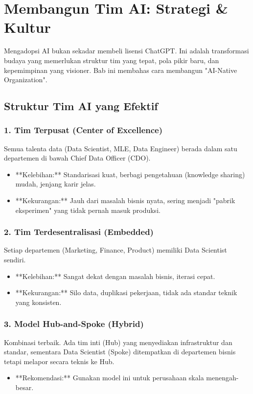 \chapter{Membangun Tim AI: Strategi \& Kultur}
\label{chap:ai_team}

Mengadopsi AI bukan sekadar membeli lisensi ChatGPT. Ini adalah transformasi budaya yang memerlukan struktur tim yang tepat, pola pikir baru, dan kepemimpinan yang visioner. Bab ini membahas cara membangun "AI-Native Organization".

\section{Struktur Tim AI yang Efektif}

\subsection{1. Tim Terpusat (Center of Excellence)}
Semua talenta data (Data Scientist, MLE, Data Engineer) berada dalam satu departemen di bawah Chief Data Officer (CDO).
\begin{itemize}
    \item **Kelebihan:** Standarisasi kuat, berbagi pengetahuan (knowledge sharing) mudah, jenjang karir jelas.
    \item **Kekurangan:** Jauh dari masalah bisnis nyata, sering menjadi "pabrik eksperimen" yang tidak pernah masuk produksi.
\end{itemize}

\subsection{2. Tim Terdesentralisasi (Embedded)}
Setiap departemen (Marketing, Finance, Product) memiliki Data Scientist sendiri.
\begin{itemize}
    \item **Kelebihan:** Sangat dekat dengan masalah bisnis, iterasi cepat.
    \item **Kekurangan:** Silo data, duplikasi pekerjaan, tidak ada standar teknik yang konsisten.
\end{itemize}

\subsection{3. Model Hub-and-Spoke (Hybrid)}
Kombinasi terbaik. Ada tim inti (Hub) yang menyediakan infrastruktur dan standar, sementara Data Scientist (Spoke) ditempatkan di departemen bisnis tetapi melapor secara teknis ke Hub.
\begin{itemize}
    \item **Rekomendasi:** Gunakan model ini untuk perusahaan skala menengah-besar.
\end{itemize}

